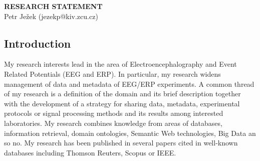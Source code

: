 \documentclass[a4paper, 10pt]{article}
\begin{document}
\thispagestyle{fancy}
\lhead{}
\rhead{}
\renewcommand{\headrulewidth}{0pt}
\renewcommand{\footrulewidth}{0pt}
\fancyfoot[C]{\footnotesize \textcolor{gray}{}}

\pagestyle{fancy}
\rhead{\textcolor{gray}{\thepage/\totalpages{}}}



\begin{center}
{\LARGE \bf RESEARCH STATEMENT}\\
\vspace*{0.1cm}
{\normalsize Petr Je\v{z}ek (jezekp@kiv.zcu.cz)}
\end{center}






\subsection*{Introduction}

My research interests lead in the area of Electroencephalography and Event Related Potentials (EEG and ERP). In particular, my research widens management of data and metadata of EEG/ERP experiments. A common thread of my research is a definition of the domain and its brief description together with the development of a strategy for sharing data, metadata, experimental protocols or signal processing methods and its results among interested laboratories. My research combines knowledge from areas of databases, information retrieval, domain ontologies, Semantic Web technologies, Big Data an so no. My research has been published in several papers cited in well-known databases including Thomson Reuters, Scopus or IEEE.
\end{document}

